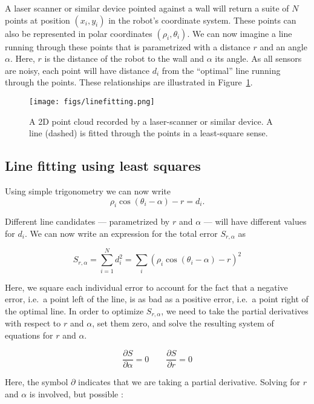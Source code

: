 A laser scanner or similar device pointed against a wall will return a suite of $N$ points at position $(x_i,y_i)$ in the robot's coordinate system. These points can also be represented in polar coordinates $ (\rho_i,\theta_i)$. We can now imagine a line running through these points that is parametrized with a distance $r$ and an angle $\alpha$. Here, $r$ is the distance of the robot to the wall and $ \alpha$ its angle. As all sensors are noisy, each point will have distance $d_i$ from the ``optimal'' line running through the points. These relationships are illustrated in Figure~\ref{fig:linefitting}.
\begin{figure}
	\centering
		\texttt{[image: figs/linefitting.png]}
	\caption{A 2D point cloud recorded by a laser-scanner or similar device. A line (dashed) is fitted through the points in a least-square sense.}
	\label{fig:linefitting}
\end{figure}

\subsection{Line fitting using least squares}
Using simple trigonometry we can now write
\begin{equation}
\rho_i \cos(\theta_i-\alpha)-r=d_i.
\end{equation}

Different line candidates --- parametrized by $ r$ and $ \alpha$ --- will have different values for $ d_i$. We can now write an expression for the total error $ S_{r,\alpha}$ as

\begin{equation}
S_{r,\alpha}=\sum_{i=1}^{N}{d_i^2}=\sum_i(\rho_i \cos(\theta_i-\alpha)-r)^2
\end{equation}

Here, we square each individual error to account for the fact that a negative error, i.e.\ a point left of the line, is as bad as a positive error, i.e.\ a point right of the optimal line. In order to optimize $ S_{r,\alpha}$, we need to take the partial derivatives with respect to $ r$ and $ \alpha$, set them zero, and solve the resulting system of equations for $ r$ and $ \alpha$.

\begin{equation}
\frac{\partial{S}}{\partial{\alpha}}=0 \qquad \frac{\partial{S}}{\partial{r}}=0
\end{equation}

Here, the symbol $ \partial$ indicates that we are taking a partial derivative. Solving for $r$ and $\alpha$ is involved, but possible \cite{siegwart2011introduction}:

